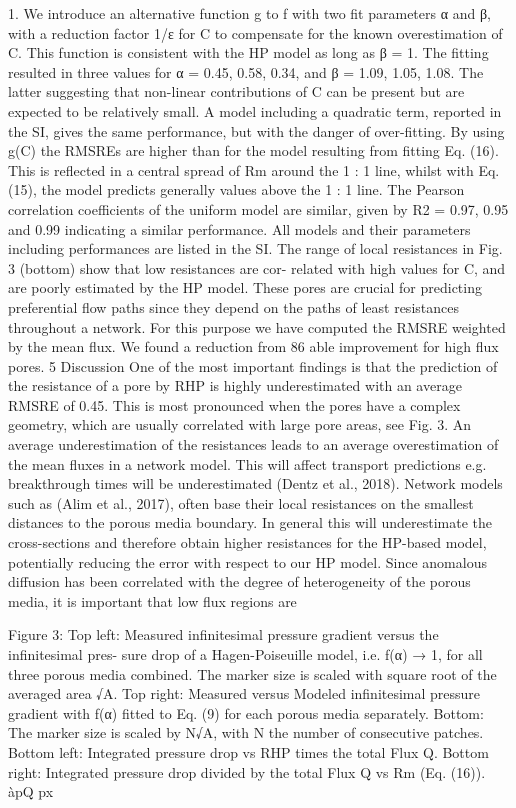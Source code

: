1. We introduce an alternative function g to f with two fit parameters α and β,
with a reduction factor 1/ε for C to compensate for the known overestimation of C. This function is consistent with the HP model as long as β = 1. The fitting resulted in three values for α = 0.45, 0.58, 0.34, and β = 1.09, 1.05, 1.08. The latter suggesting that non-linear contributions of C can be present but are expected to be relatively small. A model including a quadratic term, reported in the SI, gives the same performance, but with the danger of over-fitting. By using g(C) the RMSREs are higher than for the model resulting from fitting Eq. (16). This is reflected in a central spread of Rm around the
1 : 1 line, whilst with Eq. (15), the model predicts generally values above the 1 : 1 line.
The Pearson correlation coefficients of the uniform model are similar, given by R2 = 0.97, 0.95 and 0.99 indicating a similar performance. All models and their parameters including performances are listed in the SI.
The range of local resistances in Fig. 3 (bottom) show that low resistances are cor-
related with high values for C, and are poorly estimated by the HP model. These pores
are crucial for predicting preferential flow paths since they depend on the paths of least resistances throughout a network. For this purpose we have computed the RMSRE weighted
by the mean flux. We found a reduction from 86%
able improvement for high flux pores.
5 Discussion
One of the most important findings is that the prediction of the resistance of a pore by RHP is highly underestimated with an average RMSRE of 0.45. This is most pronounced when the pores have a complex geometry, which are usually correlated with large pore areas, see Fig. 3. An average underestimation of the resistances leads to an average overestimation of the mean fluxes in a network model. This will affect transport predictions
e.g. breakthrough times will be underestimated (Dentz et al., 2018). Network models
such as (Alim et al., 2017), often base their local resistances on the smallest distances
to the porous media boundary. In general this will underestimate the cross-sections and therefore obtain higher resistances for the HP-based model, potentially reducing the error with respect to our HP model. Since anomalous diffusion has been correlated with
the degree of heterogeneity of the porous media, it is important that low flux regions are


Figure 3: Top left: Measured infinitesimal pressure gradient versus the infinitesimal pres- sure drop of a Hagen-Poiseuille model, i.e. f(α) → 1, for all three porous media combined. The marker size is scaled with square root of the averaged area √A. Top right: Measured versus Modeled infinitesimal pressure gradient with f(α) fitted to Eq. (9) for each porous media separately. Bottom: The marker size is scaled by N√A, with N the number of consecutive patches. Bottom left: Integrated pressure drop vs RHP times the total Flux Q. Bottom right: Integrated pressure drop divided by the total Flux Q vs Rm (Eq. (16)).
àpQ px


